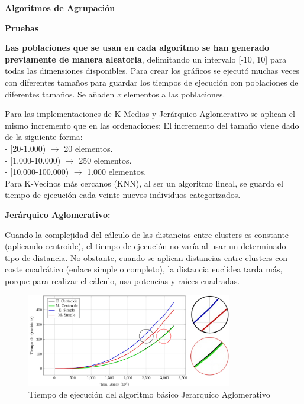 \begin{flushleft}
\textbf{Algoritmos de Agrupación}
	\begin{mdframed}[roundcorner=5pt]
		\textbf{\underline{Pruebas}}
		\vspace{0.1cm}
		
		\scriptsize	
		\textbf{Las poblaciones que se usan en cada algoritmo se han generado previamente de manera aleatoria}, delimitando un intervalo [-10, 10] para todas las dimensiones disponibles. Para crear los gráficos se ejecutó muchas veces con diferentes tamaños para guardar los tiempos de ejecución con poblaciones de diferentes tamaños. Se añaden \textit{x} elementos a las poblaciones.
		
		
		\begin{tcolorbox}[boxrule=0.5pt, fontupper=\small]
			\scriptsize
			Para las implementaciones de K-Medias y Jerárquico Aglomerativo se aplican el mismo incremento que en las ordenaciones:
			El incremento del tamaño viene dado de la siguiente forma:\\
			- [20-1.000) $\rightarrow$ 20 elementos.\\
			- [1.000-10.000) $\rightarrow$ 250 elementos.\\
			- [10.000-100.000) $\rightarrow$ 1.000 elementos.\\
			
			Para K-Vecinos más cercanos (KNN), al ser un algoritmo lineal, se guarda el tiempo de ejecución cada veinte nuevos individuos categorizados.
			
		\end{tcolorbox}
		
	\end{mdframed}
\end{flushleft}


\textbf{Jerárquico Aglomerativo:}

Cuando la complejidad del cálculo de las distancias entre clusters es constante (aplicando centroide), el tiempo de ejecución no varía al usar un determinado tipo de distancia.
No obstante, cuando se aplican distancias entre clusters con coste cuadrático (enlace simple o completo), la distancia euclídea tarda más, porque para realizar el cálculo, usa potencias y raíces cuadradas.



\begin{figure}[!h]
	\centering
	\includegraphics[width=0.8\textwidth]{images/chapter_4/jerarquico}
	\caption{Tiempo de ejecución del algoritmo básico Jerarquíco Aglomerativo}
	\label{fig:prueba_jerarquicosec}
\end{figure}

